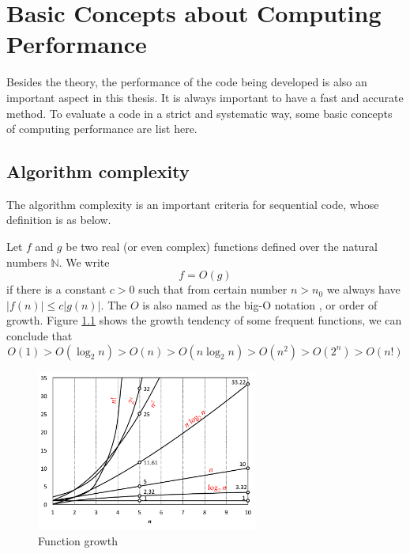 
\chapter{Basic Concepts about Computing Performance\label{chpt:computing-performance}}

Besides the theory, the performance of the code being developed is
also an important aspect in this thesis. It is always important to
have a fast and accurate method. To evaluate a code in a strict and
systematic way, some basic concepts of computing performance are list
here. 


\section{Algorithm complexity}

The algorithm complexity is an important criteria for sequential code,
whose definition is as below.

Let $f$ and $g$ be two real (or even complex) functions defined
over the natural numbers $\mathbb{N}$. We write
\begin{equation}
f=O(g)
\end{equation}
if there is a constant $c>0$ such that from certain number $n>n_{0}$
we always have $\left|f(n)\right|\leq c\left|g(n)\right|.$ The $O$
is also named as the big-O notation \citep{Complexity}, or order
of growth. Figure \ref{fig:order-of-growth} shows the growth tendency
of some frequent functions, we can conclude that 
\begin{equation}
O(1)>O(\log_{2}n)>O(n)>O(n\log_{2}n)>O(n^{2})>O(2^{n})>O(n!)
\end{equation}


\begin{figure}[h]
\begin{centering}
\includegraphics[width=0.65\textwidth]{_figure/orders-of-growth}
\par\end{centering}

\caption{Function growth\label{fig:order-of-growth}}
\end{figure}


